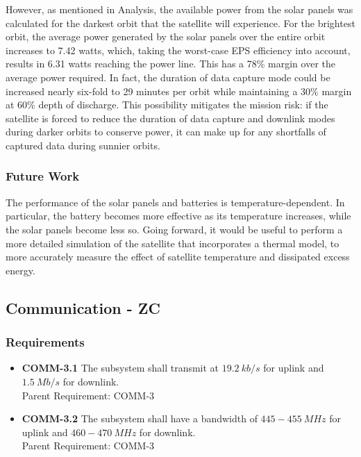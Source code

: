 \documentclass[12pt]{article}
\begin{document}
However, as mentioned in Analysis, the available power from the solar panels was calculated for the darkest orbit that the satellite will experience.  For the brightest orbit, the average power generated by the solar panels over the entire orbit increases to 7.42 watts, which, taking the worst-case EPS efficiency into account, results in 6.31 watts reaching the power line.  This has a 78\% margin over the average power required.  In fact, the duration of data capture mode could be increased nearly six-fold to 29 minutes per orbit while maintaining a 30\% margin at 60\% depth of discharge.  This possibility mitigates the mission risk: if the satellite is forced to reduce the duration of data capture and downlink modes during darker orbits to conserve power, it can make up for any shortfalls of captured data during sunnier orbits.

			\subsubsection{Future Work}
The performance of the solar panels and batteries is temperature-dependent.  In particular, the battery becomes more effective as its temperature increases, while the solar panels become less so.  Going forward, it would be useful to perform a more detailed simulation of the satellite that incorporates a thermal model, to more accurately measure the effect of satellite temperature and dissipated excess energy.

\newpage
\FloatBarrier
		\subsection{Communication - ZC}

			\subsubsection{Requirements}
			
\begin{itemize}
\item \textbf{COMM-3.1} The subsystem shall transmit at $19.2\ kb/s$ for uplink and $1.5\ Mb/s$ for downlink. \\
Parent Requirement: COMM-3
\item \textbf{COMM-3.2} The subsystem shall have a bandwidth of $445-455\ MHz$ for uplink and $460-470\ MHz$ for downlink. \\
Parent Requirement: COMM-3
\end{itemize}
\end{document}
